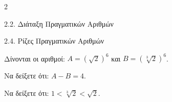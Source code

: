 \begin{ylh}{2}
    \item 2.2. Διάταξη Πραγματικών Αριθμών
    \item 2.4. Ρίζες Πραγματικών Αριθμών
\end{ylh}
Δίνονται οι αριθμοί: ${A} = (\sqrt{2})^6$ και ${B} = (\sqrt[3]{2})^6$.

\begin{alist}
\item Να δείξετε ότι: ${A} - {B} = 4$.
\item Να δείξετε ότι: $1 < \sqrt[3]{2} < \sqrt{2}$.
\end{alist}

